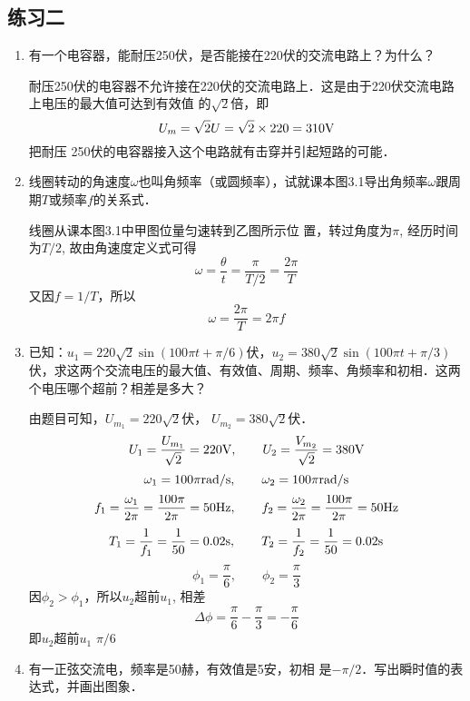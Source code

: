\subsection{练习二}
\begin{enumerate}
    \item 有一个电容器，能耐压250伏，是否能接在220伏的交流电路上？为什么？


    \begin{solution}
        耐压250伏的电容器不允许接在220伏的交流电路上．这是由于220伏交流电路上电压的最大值可达到有效值
        的$\sqrt{2}$倍，即
        \[U_m=\sqrt{2}U=\sqrt{2}\times220=310{\rm V}\]
        把耐压
        250伏的电容器接入这个电路就有击穿并引起短路的可能．
    \end{solution}
    
    \item 线圈转动的角速度$\omega$也叫角频率（或圆频率），试就课本图3.1导出角频率$\omega$跟周期$T$或频率$f$的关系式．


    \begin{solution}
        线圈从课本图3.1中甲图位量匀速转到乙图所示位
        置，转过角度为$\pi$, 经历时间为$T/2$, 故由角速度定义式可得
\[\omega=\frac{\theta}{t}=\frac{\pi}{T/2}=\frac{2\pi}{T}\]
又因$f=1/T$，所以
\[\omega=\frac{2\pi}{T}=2\pi f\]
    \end{solution}
    
    \item 已知：$u_1=220\sqrt{2}\sin(100\pi t+\pi /6)$伏，$u_2=380\sqrt{2}\sin(100\pi t+\pi /3)$伏，求这两个交流电压的最大值、有效值、周期、频率、角频率和初相．这两个电压哪个超前？相差是多大？


    \begin{solution}
        由题目可知，$U_{m_1}=220\sqrt{2}$伏，
        $U_{m_2}=380\sqrt{2}$伏．
\[        U_1=\frac{U_{m_1}}{\sqrt{2}}=220{\rm V},\qquad U_2=
 \frac{V_{m_2}}{\sqrt{2}}=380{\rm V}\]
    \[\omega_1=100\pi {\rm rad/s},\qquad \omega_2=100\pi {\rm rad/s}\]
\[f_1=\frac{\omega_1}{2\pi}=\frac{100\pi}{2\pi}=50{\rm Hz},\qquad f_2=\frac{\omega_2}{2\pi}=\frac{100\pi}{2\pi}=50{\rm Hz}\]
\[T_1=\frac{1}{f_1}=\frac{1}{50}=0.02{\rm s},\qquad T_2=\frac{1}{f_2}=\frac{1}{50}=0.02{\rm s}\]
\[\phi_1=\frac{\pi}{6},\qquad \phi_2=\frac{\pi}{3}\]
因$\phi_2>\phi_1$，所以$u_2$超前$u_1$, 相差
$$\Delta\phi=\frac{\pi}{6}-\frac{\pi}{3}=-\frac{\pi}{6}$$
即$u_2$超前$u_1$ $\pi/6$
    \end{solution}
    
    \item 有一正弦交流电，频率是50赫，有效值是5安，初相
    是$-\pi/2$．写出瞬时值的表达式，并画出图象．


\end{enumerate}
